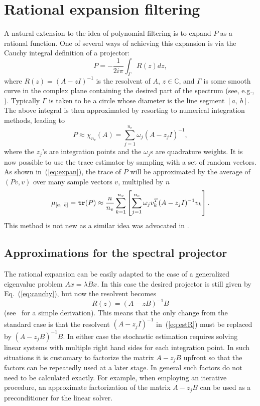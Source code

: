 \documentclass[12pt]{article}		\usepackage{tabls,multirow}
\def\trace{\mbox{\tt tr}}
\newcommand{\ab}{[a, \ b]}
\def\inv{^{-1}}\def\backw{{\bf B}}\def\diag{\mbox{Diag}\,}
\def\nref#1{(\ref{#1})}
\newcommand{\eq}[1]{\begin{equation}\label{#1}}
\newcommand{\en}{\end{equation}}
\begin{document}
\section{Rational expansion filtering} 
\label{sec:rational}
A natural extension to the idea of polynomial filtering
is to expand $P$ as a rational function. One of several ways
of achieving this expansion is via the Cauchy integral definition
of a projector: 
\eq{eq:cauchy}
P = - \frac{1}{2 i \pi } \int_{\Gamma} R(z) dz, 
\en 
 where $R(z) = (A-zI)\inv$ is the resolvent of $A$, $z \in
 \mathbb{C}$, and $\Gamma$ is some smooth curve in the complex plane
 containing the desired part of the spectrum (see, e.g.,
 \cite{Saad-book3}). Typically $\Gamma$ is taken to be a circle
 whose diameter is the line segment $\ab$.  The above integral is
 then approximated by resorting to numerical integration methods,
 leading to
\[
P \approx \chi_{n_c}(A) = \sum_{j=1}^{n_c}  \omega_j (A - z_j I)\inv ,  
\]
where the $z_j$'s are integration points and the $\omega_j$s are quadrature
weights. 
It is now possible to use the trace estimator by sampling with 
a set of random vectors. As shown in~(\ref{eq:expan}), the trace of $P$ will be 
approximated  by the average of $(Pv,v)$ over many sample
vectors $v$, multiplied by $n$
\eq{eq:estR}
\mu_{\ab} = \trace (P) \approx \frac{n}{n_v} \sum_{k=1}^{n_v} 
\left[
\sum_{j=1}^{n_c} \omega_j v_k^T (A - z_j I)\inv v_k \right] . 
\en
This method is not new as 
a similar idea was advocated in \cite{FutamuraSakuraiEigCnt}.

\subsection{Approximations for the spectral projector} 
\label{sec:ratGen} 
The rational expansion can be easily adapted to the case of a
generalized eigenvalue problem $Ax = \lambda B x $.  In this case the
desired projector is still given by Eq.~\nref{eq:cauchy}, but now
the resolvent becomes
\[
 R(z) = (A-z B)\inv B
\] 
(see~\cite{Kramer-al-FEAST-2013} for a simple derivation). This means
that the only change from the standard case is that the resolvent
$(A-z_j I)\inv$ in~(\ref{eq:estR}) must be replaced by $(A-z_j B)\inv
B$. In either case the stochastic estimation requires solving linear
systems with multiple right hand sides for each integration point. In
such situations it is customary to factorize the matrix $A-z_j B$
upfront so that the factors can be repeatedly used at a later
stage. In general such factors do not need to be calculated
exactly. For example, when employing an iterative procedure, an
approximate factorization of the matrix $A - z_j B$ can be used as a
preconditioner for the linear solver.
\end{document}
